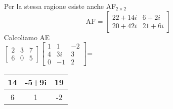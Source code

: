 Per la stessa ragione esiste anche AF$_{2\times 2}$
$$
\textrm{AF}=
\begin{bmatrix}
    22+14i & 6 + 2i\\
    20 + 42i & 21+ 6i
\end{bmatrix}
$$
Calcoliamo AE\\

$
\begin{bmatrix}
    2 & 3 & 7\\
    6 & 0 & 5 
\end{bmatrix}
\begin{bmatrix}
    1 & 1 & -2\\
    4 & 3i & 3\\
    0 & -1 & 2
\end{bmatrix}
$=
\begin{tabular}{|c|c|c|}
    \hline
    14 & -5+9i & 19 \\
    \hline
    6 & 1 & -2\\
    \hline
\end{tabular}
